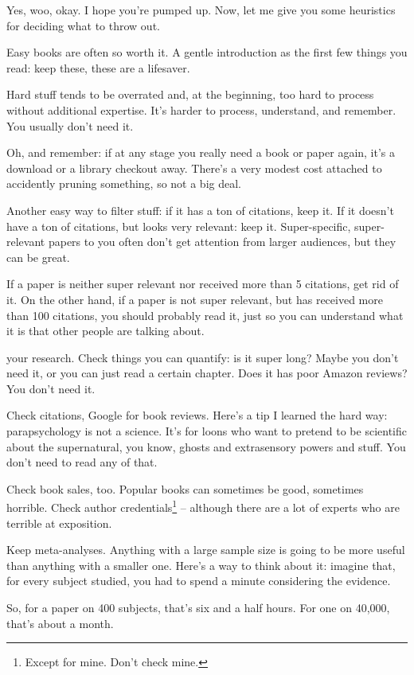 Yes, woo, okay. I hope you're pumped up. Now, let me give you some heuristics
for deciding what to throw out.

Easy books are often so worth it. A gentle introduction as the first few things
you read: keep these, these are a lifesaver.

Hard stuff tends to be overrated and, at the beginning, too hard to process
without additional expertise. It's harder to process, understand, and
remember. You usually don't need it.

Oh, and remember: if at any stage you really need a book or paper again, it's a
download or a library checkout away. There's a very modest cost attached to
accidently pruning something, so not a big deal.

Another easy way to filter stuff: if it has a ton of citations, keep it. If it
doesn't have a ton of citations, but looks very relevant: keep
it. Super-specific, super-relevant papers to you often don't get attention from
larger audiences, but they can be great.

If a paper is neither super relevant nor received more than 5 citations, get rid
of it. On the other hand, if a paper is not super relevant, but has received
more than 100 citations, you should probably read it, just so you can understand
what it is that other people are talking about.

 your research. Check things you can quantify: is it
super long? Maybe you don't need it, or you can just read a certain
chapter. Does it has poor Amazon reviews? You don't need it.

Check citations, Google for book reviews. Here's a tip I learned the hard way:
parapsychology is not a science. It's for loons who want to pretend to be
scientific about the supernatural, you know, ghosts and extrasensory powers and
stuff. You don't need to read any of that.

Check book sales, too. Popular books can sometimes be good, sometimes
horrible. Check author credentials\footnote{Except for mine. Don't check mine.} -- although there are a lot of experts who
are terrible at exposition.

Keep meta-analyses. Anything with a large sample size is going to be more useful
than anything with a smaller one. Here's a way to think about it: imagine that,
for every subject studied, you had to spend a minute considering the evidence.

So, for a paper on 400 subjects, that's six and a half hours. For one on 40,000,
that's about a month.

